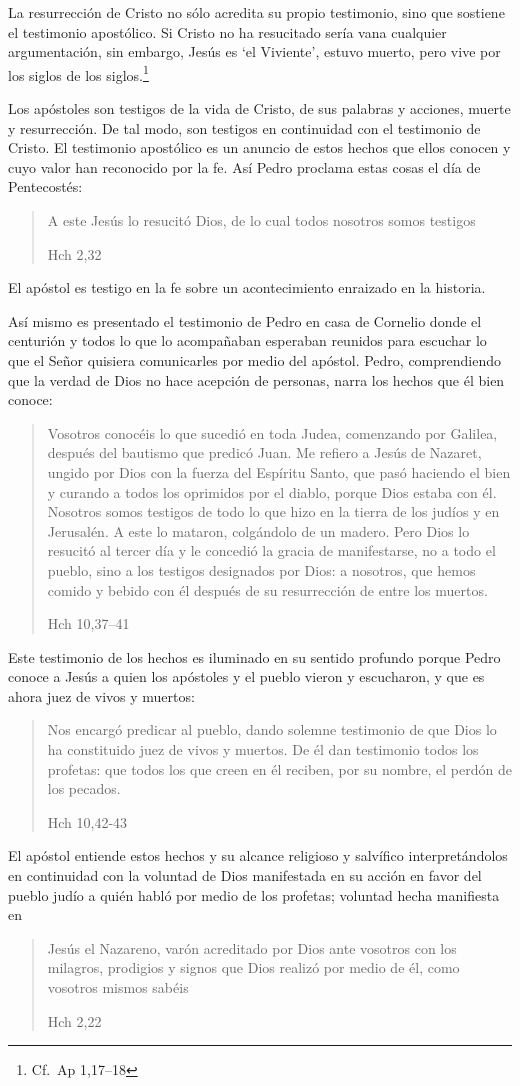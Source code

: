 La resurrección de Cristo no sólo acredita su propio testimonio, sino que sostiene el testimonio apostólico. Si Cristo no ha resucitado sería vana cualquier argumentación, sin embargo, Jesús es \enquote*{el Viviente}, estuvo muerto, pero vive por los siglos de los siglos.\footnote{Cf.~Ap 1,17--18}

Los apóstoles son testigos de la vida de Cristo, de sus palabras y acciones, muerte y resurrección. De tal modo, son testigos en continuidad con el testimonio de Cristo. El testimonio apostólico es un anuncio de estos hechos que ellos conocen y cuyo valor han reconocido por la fe. Así Pedro proclama estas cosas el día de Pentecostés: \blockquote[Hch 2,32]{A este Jesús lo resucitó Dios, de lo cual todos nosotros somos testigos}. El apóstol es testigo en la fe sobre un acontecimiento enraizado en la historia.\autocite[Cf.~][402; 406]{ninot2009tf}

Así mismo es presentado el testimonio de Pedro en casa de Cornelio donde el centurión y todos lo que lo acompañaban esperaban reunidos para escuchar lo que el Señor quisiera comunicarles por medio del apóstol. Pedro, comprendiendo que la verdad de Dios no hace acepción de personas, narra los hechos que él bien conoce: \blockquote[Hch 10,37--41]{Vosotros conocéis lo que sucedió en toda Judea, comenzando por Galilea, después del bautismo que predicó Juan. Me refiero a Jesús de Nazaret, ungido por Dios con la fuerza del Espíritu Santo, que pasó haciendo el bien y curando a todos los oprimidos por el diablo, porque Dios estaba con él. Nosotros somos testigos de todo lo que hizo en la tierra de los judíos y en Jerusalén. A este lo mataron, colgándolo de un madero. Pero Dios lo resucitó al tercer día y le concedió la gracia de manifestarse, no a todo el pueblo, sino a los testigos designados por Dios: a nosotros, que hemos comido y bebido con él después de su resurrección de entre los muertos.} Este testimonio de los hechos es iluminado en su sentido profundo porque Pedro conoce a Jesús a quien los apóstoles y el pueblo vieron y escucharon, y que es ahora juez de vivos y muertos: \blockquote[Hch 10,42-43]{Nos encargó predicar al pueblo, dando solemne testimonio de que Dios lo ha constituido juez de vivos y muertos. De él dan testimonio todos los profetas: que todos los que creen en él reciben, por su nombre, el perdón de los pecados.}

El apóstol entiende estos hechos y su alcance religioso y salvífico interpretándolos en continuidad con la voluntad de Dios manifestada en su acción en favor del pueblo judío a quién habló por medio de los profetas; voluntad hecha manifiesta en \blockquote[Hch 2,22]{Jesús el Nazareno, varón acreditado por Dios ante vosotros con los milagros, prodigios y signos que Dios realizó por medio de él, como vosotros mismos sabéis}.

